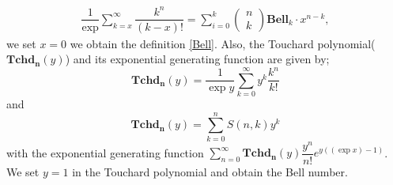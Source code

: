 \documentclass[pdflatex,sn-mathphys-num]{sn-jnl}%
\theoremstyle{thmstyleone}%
\theoremstyle{thmstyletwo}%
\theoremstyle{thmstylethree}%
\begin{document}
\begin{align*}
    \dfrac{1}{\exp}\sum_{k=x}^{\infty}\dfrac{k^n}{(k-x)!}=\sum_{i=0}^k \left(\begin{array}{c} n \\ k \end{array}\right)\mathbf{Bell}_k \cdotp x^{n-k},
\end{align*}
we set $x=0$ we obtain the definition \ref{Bell}. Also, the Touchard polynomial($\mathbf{Tchd_{n}}(y)$) \cite{touchard1933proprietes} and its exponential generating function are given by;
\begin{equation}
    \mathbf{Tchd_{n}}(y)= \dfrac{1}{\exp{y}}\sum_{k=0}^{\infty}y^k \dfrac{k^n}{k!}
\end{equation}
and
\begin{equation}
   \mathbf{Tchd_{n}}(y)= \sum_{k=0}^{n} S(n,k)y^k
\end{equation}
with the exponential generating function $\sum_{n=0}^{\infty}\mathbf{Tchd_{n}}(y)\dfrac{y^n}{n!} e^{y((\exp x)-1)}$.
We set $y=1$ in the Touchard polynomial and obtain the Bell number.





\end{document}
